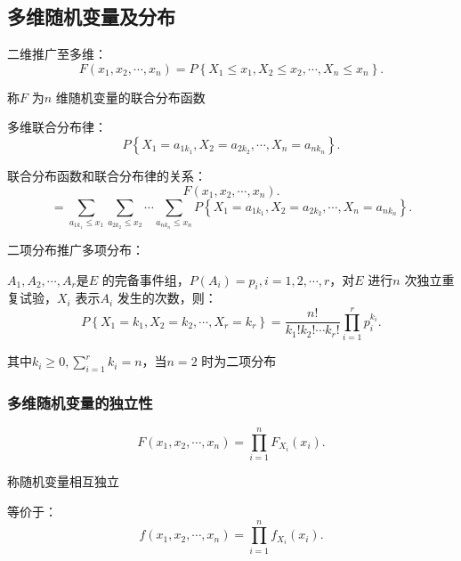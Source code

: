 \subsection{多维随机变量及分布}%
\label{sub:多维随机变量及分布}
\begin{defi}
    二维推广至多维：
    \[
        F\left( x_1,x_2,\cdots,x_n \right) =P\left\{ X_1\le x_1,X_2\le x_2,\cdots,X_n\le x_n \right\} 
    .\] 

    称$F$ 为$n$ 维随机变量的联合分布函数
\end{defi}
\begin{defi}
    多维联合分布律：
    \[
        P\left\{ X_1=a_{1k_1},X_2=a_{2k_2},\cdots,X_n=a_{nk_n} \right\} 
    .\] 
\end{defi}
联合分布函数和联合分布律的关系：\[
    F\left( x_1,x_2,\cdots,x_n \right) 
.\]
\[
    =\sum_{a_{1k_1}\le x_1}\sum_{a_{2k_2}\le x_2}\cdots \sum_{a_{nk_n}\le x_{n}} P\left\{ X_1=a_{1k_1},X_2=a_{2k_2},\cdots,X_n=a_{nk_n} \right\} 
.\] 
\begin{notation}
    二项分布推广多项分布：

    $A_1,A_2,\cdots,A_r$是$E$ 的完备事件组，$P\left( A_i \right) =p_i,i=1,2,\cdots,r$，对$E$ 进行$n$ 次独立重复试验，$X_{i}$ 表示$A_{i}$ 发生的次数，则：\[
        P\left\{ X_1=k_1,X_2=k_2,\cdots,X_r=k_r \right\} =\frac{n!}{k_1!k_2!\cdots k_r!}\prod_{i=1}^{r} p_{i}^{k_i} 
    .\] 

    其中$k_i\ge 0,{\sum_{i=1}^{r} k_i=n}$，当$n=2$ 时为二项分布
\end{notation}

\subsubsection{多维随机变量的独立性}%
\label{subsub:多维随机变量的独立性}
\begin{defi}
    \[
        F\left( x_1,x_2,\cdots,x_n \right) =\prod_{i=1}^{n} F_{X_i}\left( x_i \right) 
    .\] 

    称随机变量相互独立

    等价于：\[
        f\left( x_1,x_2,\cdots,x_n \right) =\prod_{i=1}^{n} f_{X_i}\left( x_i \right)  
    .\] 
\end{defi}

